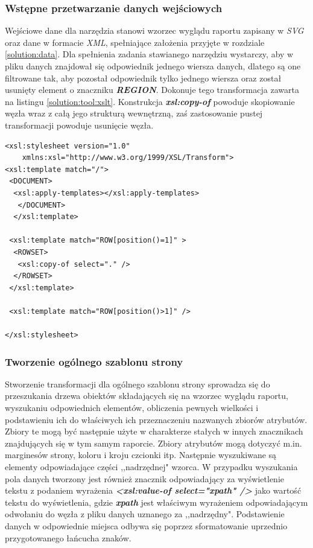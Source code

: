 \documentclass[11pt,a4paper]{article}
\begin{document}
\subsubsection{Wstępne przetwarzanie danych wejściowych} \label{solution:tool:input}
Wejściowe dane dla narzędzia stanowi wzorzec wyglądu raportu zapisany w \emph{SVG} oraz dane w formacie \emph{XML}, spełniające założenia przyjęte w rozdziale \ref{solution:data}.  Dla spełnienia zadania stawianego narzędziu wystarczy, aby w pliku danych znajdował się odpowiednik jednego wiersza danych, dlatego są one filtrowane tak, aby pozostał odpowiednik tylko jednego wiersza oraz został usunięty element o znaczniku \emph{\textbf{REGION}}. Dokonuje tego transformacja zawarta na listingu \ref{solution:tool:xslt}. Konstrukcja \textbf{\emph{xsl:copy-of}} powoduje skopiowanie węzła wraz z całą jego strukturą wewnętrzną, zaś zastosowanie pustej transformacji powoduje usunięcie węzła. 

\lstset{language=XSLT}
\begin{lstlisting}[frame=single,caption=Transformacja wstępnie przetwarzająca dane, label=solution:tool:xslt]
<xsl:stylesheet version="1.0" 
    xmlns:xsl="http://www.w3.org/1999/XSL/Transform">
<xsl:template match="/">
 <DOCUMENT>
  <xsl:apply-templates></xsl:apply-templates>
   </DOCUMENT>
  </xsl:template>

 <xsl:template match="ROW[position()=1]" >
  <ROWSET>
   <xsl:copy-of select="." />
  </ROWSET>
 </xsl:template>

 <xsl:template match="ROW[position()>1]" />

</xsl:stylesheet>
\end{lstlisting}


\subsubsection{Tworzenie ogólnego szablonu strony}
Stworzenie transformacji dla ogólnego szablonu strony sprowadza się do przeszukania drzewa obiektów składających się na wzorzec wyglądu raportu, wyszukaniu odpowiednich elementów, obliczenia pewnych wielkości i podstawieniu ich do właściwych ich przeznaczeniu nazwanych zbiorów atrybutów. Zbiory te mogą być następnie użyte w charakterze stałych w innych znacznikach znajdujących się w tym samym raporcie. Zbiory atrybutów mogą dotyczyć m.in. marginesów strony, koloru i kroju czcionki itp. Następnie wyszukiwane są elementy odpowiadające części ,,nadrzędnej" wzorca. W przypadku wyszukania pola danych tworzony jest również znacznik odpowiadający za wyświetlenie tekstu z podaniem wyrażenia \textbf{\emph{\textless xsl:value-of select="xpath" /\textgreater}} jako wartość tekstu do wyświetlenia, gdzie \textbf{\emph{xpath}} jest właściwym wyrażeniem odpowiadającym odwołaniu do węzła z pliku danych uznanego za ,,nadrzędny". Podstawienie danych w odpowiednie miejsca odbywa się poprzez sformatowanie uprzednio przygotowanego łańcucha znaków.
\end{document}
